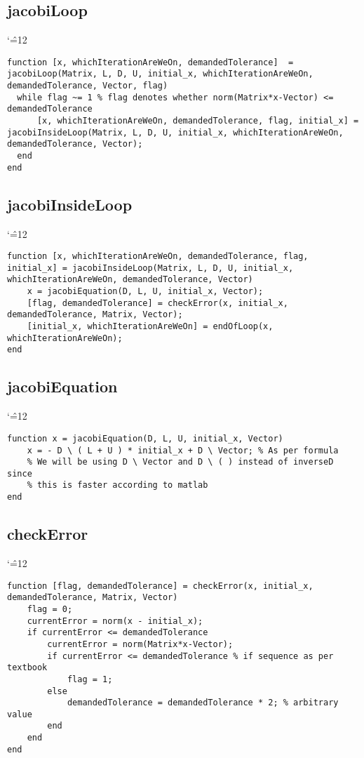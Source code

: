 \documentclass{report}
\newenvironment{simplechar}{%
   \catcode`\^=12
}{}
\begin{document}
\subsection{jacobiLoop}
\begin{simplechar}
\begin{lstlisting}
function [x, whichIterationAreWeOn, demandedTolerance]  = jacobiLoop(Matrix, L, D, U, initial_x, whichIterationAreWeOn, demandedTolerance, Vector, flag)
  while flag ~= 1 % flag denotes whether norm(Matrix*x-Vector) <= demandedTolerance
      [x, whichIterationAreWeOn, demandedTolerance, flag, initial_x] = jacobiInsideLoop(Matrix, L, D, U, initial_x, whichIterationAreWeOn, demandedTolerance, Vector);
  end
end

\end{lstlisting}
\end{simplechar}

\subsection{jacobiInsideLoop}
\begin{simplechar}
\begin{lstlisting}
function [x, whichIterationAreWeOn, demandedTolerance, flag, initial_x] = jacobiInsideLoop(Matrix, L, D, U, initial_x, whichIterationAreWeOn, demandedTolerance, Vector)
    x = jacobiEquation(D, L, U, initial_x, Vector);
    [flag, demandedTolerance] = checkError(x, initial_x, demandedTolerance, Matrix, Vector);
    [initial_x, whichIterationAreWeOn] = endOfLoop(x, whichIterationAreWeOn);
end
\end{lstlisting}
\end{simplechar}

\subsection{jacobiEquation}
\begin{simplechar}
\begin{lstlisting}
function x = jacobiEquation(D, L, U, initial_x, Vector)
    x = - D \ ( L + U ) * initial_x + D \ Vector; % As per formula
    % We will be using D \ Vector and D \ ( ) instead of inverseD since
    % this is faster according to matlab
end
\end{lstlisting}
\end{simplechar}

\subsection{checkError}
\begin{simplechar}
\begin{lstlisting}
function [flag, demandedTolerance] = checkError(x, initial_x, demandedTolerance, Matrix, Vector)
    flag = 0;
    currentError = norm(x - initial_x);
    if currentError <= demandedTolerance
        currentError = norm(Matrix*x-Vector);
        if currentError <= demandedTolerance % if sequence as per textbook
            flag = 1;
        else
            demandedTolerance = demandedTolerance * 2; % arbitrary value
        end
    end
end
\end{lstlisting}
\end{simplechar}
\end{document}
